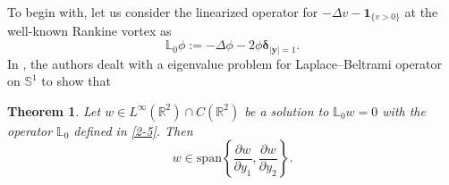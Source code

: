 \documentclass[12pt,reqno]{amsart}
\numberwithin{equation}{section}
\newtheorem{theorem}{Theorem}[section]
\theoremstyle{definition}
\theoremstyle{remark}
\begin{document}
To begin with, let us consider the linearized operator for $-\Delta v-\boldsymbol 1_{\{v>0\}}$ at the well-known Rankine vortex as
\begin{equation}\label{2-5}
	\mathbb L_0\phi:=-\Delta\phi-2\phi\boldsymbol\delta_{|\boldsymbol{y}|=1}.
\end{equation}
In \cite{Cao3}, the authors dealt with a eigenvalue problem for Laplace--Beltrami operator on $\mathbb S^1$ to show that 
\begin{theorem}\label{thm3}
	Let $w\in L^\infty(\mathbb R^2)\cap C(\mathbb R^2)$ be a solution to $\mathbb L _0w=0$ with the operator $\mathbb L_0$ defined in \eqref{2-5}. Then
	\begin{equation*}
		w\in\mathrm{span} \left\{\frac{\partial w}{\partial y_1},\frac{\partial w}{\partial y_2}\right\}.
	\end{equation*}
\end{theorem}
\end{document}
